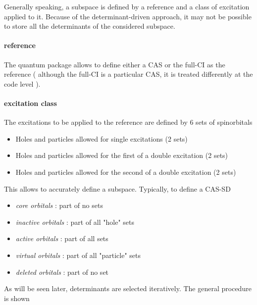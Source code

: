 Generally speaking, a subspace is defined by a reference and a class of excitation applied to it. Because of the determinant-driven approach, it may not be possible to store all the determinants of the considered subspace. 



\paragraph{reference}

The quantum package allows to define either a CAS or the full-CI as the reference ( although the full-CI is a particular CAS, it is treated differently at the code level ).

\paragraph{excitation class}
The excitations to be applied to the reference are defined by 6 sets of spinorbitals
\begin{itemize}
\item
Holes and particles allowed for single excitations (2 sets)
\item
Holes and particles allowed for the first of a double excitation (2 sets)
\item
Holes and particles allowed for the second of a double excitation (2 sets)
\end{itemize}

This allows to accurately define a subspace. Typically, to define a CAS-SD

\begin{itemize}
\item
\emph{core orbitals} : part of no sets
\item
\emph{inactive orbitals} : part of all "hole" sets
\item
\emph{active orbitals} : part of all sets
\item
\emph{virtual orbitals} : part of all "particle" sets
\item
\emph{deleted orbitals} : part of no set
\end{itemize}


 As will be seen later, determinants are selected iteratively. The general procedure is shown 



